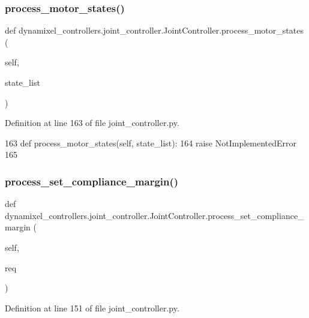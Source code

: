 \subsubsection{\texorpdfstring{process\+\_\+motor\+\_\+states()}{process\_motor\_states()}}
{\footnotesize\ttfamily def dynamixel\+\_\+controllers.\+joint\+\_\+controller.\+Joint\+Controller.\+process\+\_\+motor\+\_\+states (\begin{DoxyParamCaption}\item[{}]{self,  }\item[{}]{state\+\_\+list }\end{DoxyParamCaption})}



Definition at line 163 of file joint\+\_\+controller.\+py.


\begin{DoxyCode}
163     \textcolor{keyword}{def }process\_motor\_states(self, state\_list):
164         \textcolor{keywordflow}{raise} NotImplementedError
165 
\end{DoxyCode}
\mbox{\label{classdynamixel__controllers_1_1joint__controller_1_1_joint_controller_aed0bae387958b56f88fd707e9da9e8f1}} 
\subsubsection{\texorpdfstring{process\+\_\+set\+\_\+compliance\+\_\+margin()}{process\_set\_compliance\_margin()}}
{\footnotesize\ttfamily def dynamixel\+\_\+controllers.\+joint\+\_\+controller.\+Joint\+Controller.\+process\+\_\+set\+\_\+compliance\+\_\+margin (\begin{DoxyParamCaption}\item[{}]{self,  }\item[{}]{req }\end{DoxyParamCaption})}



Definition at line 151 of file joint\+\_\+controller.\+py.



